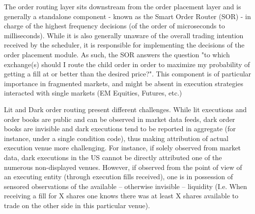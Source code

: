 The order routing layer sits downstream from the order placement layer and is generally a standalone component - known as the Smart Order Router (SOR) - in charge of the highest frequency decisions (of the order of microseconds to milliseconds). 
While it is also generally unaware of the overall trading intention received by the scheduler, it is responsible for implementing the decisions of the order placement module. As such, the SOR answers the question "to which exchange(s) should I route the child order in order to maximize my probability of getting a fill at or better than the desired price?". This component is of particular importance in fragmented markets, and might be absent in execution strategies interacted with single markets (EM Equities, Futures, etc.)

Lit and Dark order routing present different challenges. While lit executions and order books are public and can be observed in market data feeds, dark order books are invisible and dark executions tend to be reported in aggregate (for instance, under a single condition code), thus making attribution of actual execution venue more challenging. For instance, if solely observed from market data, dark executions in the US cannot be directly attributed one of the numerous non-displayed venues. However, if observed from the point of view of an executing entity (through execution fills received), one is in possession of sensored observations of the available – otherwise invisible – liquidity (I.e. When receiving a fill for X shares one knows there was at least X shares available to trade on the other side in this particular venue). 

